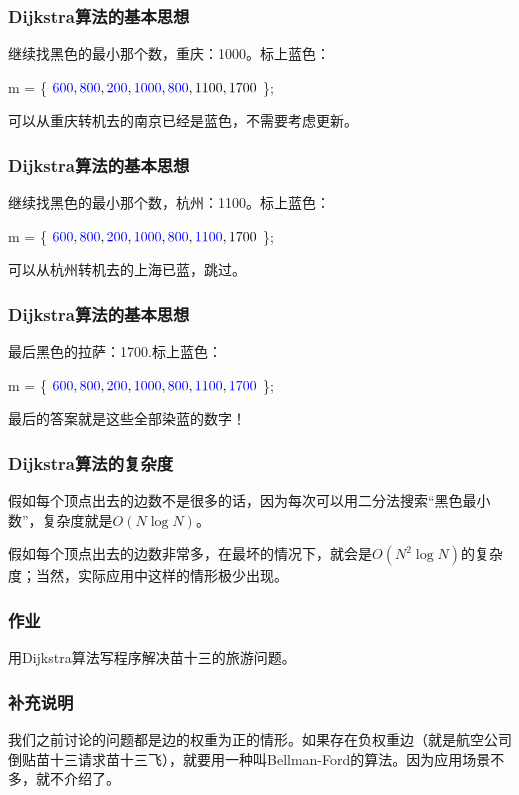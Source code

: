 \documentclass[CJK,14pt]{beamer}
\begin{document}
\begin{frame}
  \frametitle{Dijkstra算法的基本思想}
  继续找黑色的最小那个数，重庆：1000。标上蓝色：

  m = \{ ${\color{blue} 600}, {\color{blue} 800}, {\color{blue} 200}, {\color{blue} 1000}, {\color{blue} 800}, 1100, 1700$ \};

  可以从重庆转机去的南京已经是蓝色，不需要考虑更新。
\end{frame}


\begin{frame}
  \frametitle{Dijkstra算法的基本思想}
  继续找黑色的最小那个数，杭州：1100。标上蓝色：

  m = \{ ${\color{blue} 600}, {\color{blue} 800}, {\color{blue} 200}, {\color{blue} 1000}, {\color{blue} 800}, {\color{blue} 1100}, 1700$ \};

  可以从杭州转机去的上海已蓝，跳过。
\end{frame}


\begin{frame}
  \frametitle{Dijkstra算法的基本思想}
  最后黑色的拉萨：1700.标上蓝色：

  m = \{ ${\color{blue} 600}, {\color{blue} 800}, {\color{blue} 200}, {\color{blue} 1000}, {\color{blue} 800}, {\color{blue} 1100}, {\color{blue} 1700}$ \};

  最后的答案就是这些全部染蓝的数字！
\end{frame}


\begin{frame}
  \frametitle{Dijkstra算法的复杂度}
  假如每个顶点出去的边数不是很多的话，因为每次可以用二分法搜索“黑色最小数”，复杂度就是$O(N\log N)$。

  假如每个顶点出去的边数非常多，在最坏的情况下，就会是$O(N^2\log N)$的复杂度；当然，实际应用中这样的情形极少出现。

\end{frame}

\begin{frame}
  \frametitle{作业}
  用Dijkstra算法写程序解决苗十三的旅游问题。
\end{frame}



\begin{frame}
  \frametitle{补充说明}
  我们之前讨论的问题都是边的权重为正的情形。如果存在负权重边（就是航空公司倒贴苗十三请求苗十三飞），就要用一种叫Bellman-Ford的算法。因为应用场景不多，就不介绍了。
\end{frame}

  \ech
\end{document}
